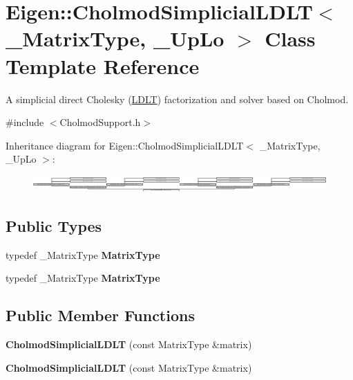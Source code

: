 \hypertarget{class_eigen_1_1_cholmod_simplicial_l_d_l_t}{}\section{Eigen\+:\+:Cholmod\+Simplicial\+L\+D\+LT$<$ \+\_\+\+Matrix\+Type, \+\_\+\+Up\+Lo $>$ Class Template Reference}
\label{class_eigen_1_1_cholmod_simplicial_l_d_l_t}


A simplicial direct Cholesky (\hyperlink{group___cholesky___module_class_eigen_1_1_l_d_l_t}{L\+D\+LT}) factorization and solver based on Cholmod.  




{\ttfamily \#include $<$Cholmod\+Support.\+h$>$}

Inheritance diagram for Eigen\+:\+:Cholmod\+Simplicial\+L\+D\+LT$<$ \+\_\+\+Matrix\+Type, \+\_\+\+Up\+Lo $>$\+:\begin{figure}[H]
\begin{center}
\leavevmode
\includegraphics[height=0.631769cm]{class_eigen_1_1_cholmod_simplicial_l_d_l_t}
\end{center}
\end{figure}
\subsection*{Public Types}
\begin{DoxyCompactItemize}
\item 
\mbox{\label{class_eigen_1_1_cholmod_simplicial_l_d_l_t_a25eb39d9c0d5baef08fda965444cb27e}} 
typedef \+\_\+\+Matrix\+Type {\bfseries Matrix\+Type}
\item 
\mbox{\label{class_eigen_1_1_cholmod_simplicial_l_d_l_t_a25eb39d9c0d5baef08fda965444cb27e}} 
typedef \+\_\+\+Matrix\+Type {\bfseries Matrix\+Type}
\end{DoxyCompactItemize}
\subsection*{Public Member Functions}
\begin{DoxyCompactItemize}
\item 
\mbox{\label{class_eigen_1_1_cholmod_simplicial_l_d_l_t_a98280cac66601a0ef98d28de1a430061}} 
{\bfseries Cholmod\+Simplicial\+L\+D\+LT} (const Matrix\+Type \&matrix)
\item 
\mbox{\label{class_eigen_1_1_cholmod_simplicial_l_d_l_t_a98280cac66601a0ef98d28de1a430061}} 
{\bfseries Cholmod\+Simplicial\+L\+D\+LT} (const Matrix\+Type \&matrix)
\end{DoxyCompactItemize}
